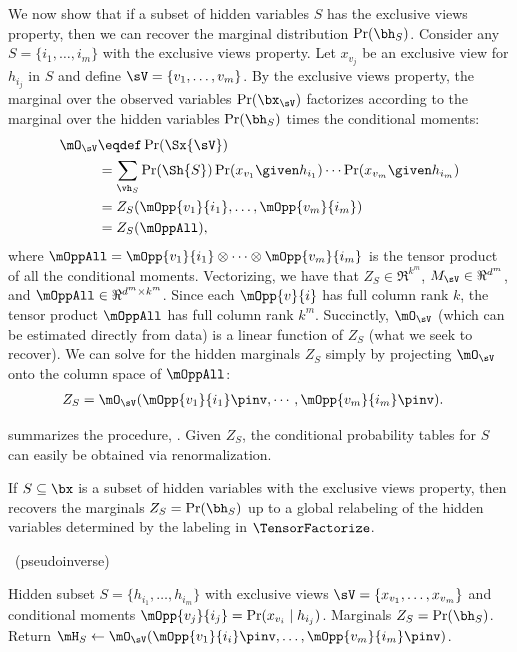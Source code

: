 We now show that if a subset of hidden variables $S$ has the exclusive views property,
then we can recover the marginal distribution $\Pr(\bh_S)$.
Consider any $S = \{i_1, \ldots, i_m\}$ with the exclusive views property. Let
  $x_{v_j}$ be an exclusive view for $h_{i_j}$ in $S$ and define $\sV
  = \{v_1, \ldots, v_m\}$. %
By the exclusive views property,
the marginal over the observed variables $\Pr(\bx_\sV)$
factorizes according to the marginal over the hidden variables $\Pr(\bh_S)$
times the conditional moments:
\begin{align*}
  \mO_\sV 
  &\eqdef \Pr(\Sx{\sV}) \\
  &= \sum_{\vh_S} \Pr(\Sh{S}) 
                    \Pr(x_{v_1} \given h_{i_1}) \cdots \Pr(x_{v_m} \given h_{i_m}) \\
  &= Z_{S}(\mOpp{v_1}{i_1},\dots,\mOpp{v_m}{i_m}) \\
  &= Z_{S}(\mOppAll),
\end{align*}
where $\mOppAll = \mOpp{v_1}{i_1} \otimes \cdots \otimes \mOpp{v_m}{i_m}$ is the tensor product of
all the conditional moments.
Vectorizing, we have that
$Z_S \in \Re^{k^m}$,
$M_\sV \in \Re^{d^m}$,
and $\mOppAll \in \Re^{d^m \times k^m}$.
Since each $\mOpp{v}{i}$ has full column rank $k$,
the tensor product $\mOppAll$ has full column rank $k^m$.
Succinctly, $\mO_\sV$ (which can be estimated directly from data)
is a linear function of $Z_S$ (what we seek to recover).
We can solve for the hidden marginals $Z_S$ simply by projecting $\mO_\sV$ onto the column
space of $\mOppAll$:
\begin{align*}
  Z_{S} &= \mO_\sV(\mOpp{v_1}{i_1}\pinv,\cdots,\mOpp{v_m}{i_m}\pinv).
\end{align*}

 summarizes the procedure, \LearnMarginals.
Given $Z_S$, the conditional probability tables for $S$ can easily be
obtained via renormalization.
\begin{theorem}
If $S \subseteq \bx$ is a subset of hidden variables with the exclusive views property,
then  recovers the marginals $Z_S
= \Pr(\bh_S)$ up to a global relabeling of the hidden variables
determined by the labeling in $\TensorFactorize$.
\end{theorem}

\begin{algorithm}
  \caption{\LearnMarginals~(pseudoinverse)}
  \label{algo:learnMarginals}
  \begin{algorithmic}
    \REQUIRE Hidden subset $S = \{ h_{i_1}, \dots, h_{i_m} \}$ with exclusive views $\sV = \{ x_{v_1}, \dots, x_{v_m} \}$
    and conditional moments $\mOpp{v_j}{i_j} = \Pr(x_{v_i} \mid h_{i_j})$.
    \ENSURE Marginals $Z_S = \Pr(\bh_S)$.
      \STATE Return $\mH_S \gets \mO_{\sV}( \mOpp{v_1}{i_i}\pinv, \dots, {\mOpp{v_m}{i_m}}\pinv )$.
  \end{algorithmic}
\end{algorithm}

